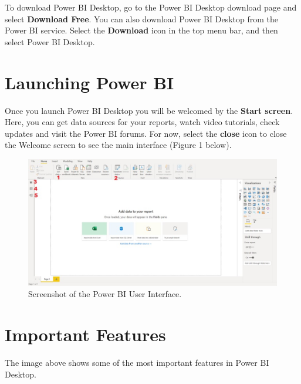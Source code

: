 \documentclass[
]{book}
\begin{document}
To download Power BI Desktop, go to the Power BI Desktop download page and select \textbf{Download Free}. You can also download Power BI Desktop from the Power BI service. Select the \textbf{Download} icon in the top menu bar, and then select Power BI Desktop.

\hypertarget{launching-power-bi}{%
\section{Launching Power BI}\label{launching-power-bi}}

Once you launch Power BI Desktop you will be welcomed by the \textbf{Start screen}. Here, you can get data sources for your reports, watch video tutorials, check updates and visit the Power BI forums. For now, select the \textbf{close} icon to close the Welcome screen to see the main interface (Figure 1 below).

\begin{figure}
\centering
\includegraphics{bi1.jpg}
\caption{Screenshot of the Power BI User Interface.}
\end{figure}

\hypertarget{important-features}{%
\section{Important Features}\label{important-features}}

The image above shows some of the most important features in Power BI Desktop.
\end{document}
